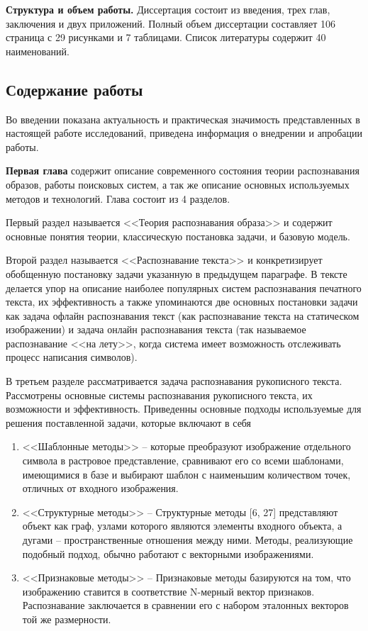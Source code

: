 \textbf{Структура и объем работы.} Диссертация состоит из введения, трех глав, заключения и двух приложений. Полный объем диссертации составляет 106 страница с 29 рисунками и 7 таблицами. Список литературы содержит 40 наименований.

\subsection*{\Large Содержание работы}
Во введении показана актуальность и практическая значимость представленных в настоящей работе исследований, приведена информация о внедрении и апробации работы.

\textbf{Первая глава} содержит описание современного состояния теории распознавания образов, работы поисковых систем, а так же описание основных используемых методов и технологий. Глава состоит из 4 разделов. 

Первый раздел называется <<Теория распознавания образа>> и содержит основные понятия теории,  классическую постановка задачи, и базовую модель.

Второй раздел называется <<Распознавание текста>> и конкретизирует обобщенную постановку задачи указанную в предыдущем параграфе. В тексте делается упор на описание наиболее популярных систем распознавания печатного текста, их эффективность а также упоминаются две основных постановки задачи как задача офлайн распознавания текст (как распознавание текста на статическом изображении) и задача онлайн распознавания текста (так называемое распознавание <<на лету>>, когда система имеет возможность отслеживать процесс написания символов).

В третьем разделе рассматривается задача распознавания рукописного текста. Рассмотрены основные системы распознавания рукописного текста, их возможности и эффективность. Приведенны основные подходы используемые для решения поставленной задачи, которые включают в себя 

\begin{enumerate}
\item  <<Шаблонные методы>> -- которые преобразуют изображение отдельного символа в растровое представление, сравнивают его со всеми шаблонами, имеющимися в базе и выбирают шаблон с наименьшим количеством точек, отличных от входного изображения.

\item <<Структурные методы>> -- Структурные методы [6, 27] представляют объект как граф, узлами которого являются элементы входного объекта, а дугами – пространственные отношения между ними. Методы, реализующие подобный подход, обычно работают с векторными изображениями.

\item <<Признаковые методы>> -- Признаковые методы базируются на том, что изображению ставится в соответствие N-мерный вектор признаков. Распознавание заключается в сравнении его с набором эталонных векторов той же размерности.
\end{enumerate}

